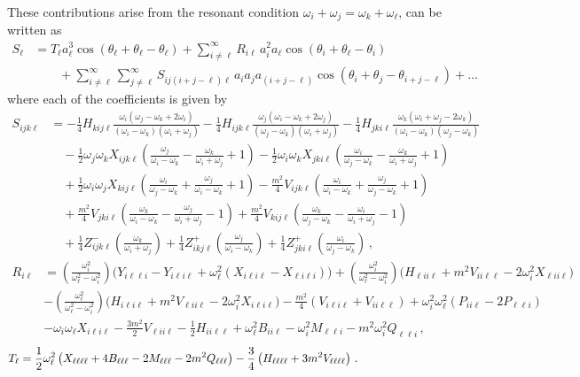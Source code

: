 \documentclass[letterpaper,11pt]{article}
\newcommand{\oi}{\omega_i}
\newcommand{\oj}{\omega_j}
\newcommand{\ok}{\omega_k}
\newcommand{\ol}{\omega_\ell}
\newcommand{\thi}{\theta_i}
\newcommand{\thj}{\theta_j}
\newcommand{\thl}{\theta_\ell}
\begin{document}
These contributions arise from the resonant condition $\oi + \oj = \ok + \ol$, can be written as
\begin{align}
S_\ell &= T_\ell a^3_\ell \cos (\thl + \thl - \thl) + \sum_{i \neq \ell}^\infty R_{i \ell} \, a^2_i a_\ell \cos(\thi + \thl - \thi) \nonumber \\
& \qquad + \sum_{i \neq \ell}^\infty \sum_{j \neq \ell}^\infty S_{i j (i + j - \ell) \ell} \, a_i a_j a_{(i + j - \ell)} \cos(\thi + \thj - \theta_{i + j -\ell} ) + \ldots
\end{align}
where each of the coefficients is given by
\begin{align}
S_{ijk\ell} &= - \frac{1}{4} H_{kij\ell} \frac{\oi (\oj - \ok + 2\oi)}{(\oi - \ok)(\oi + \oj)} -\frac{1}{4} H_{ijk\ell} \frac{\oj (\oi - \ok + 2\oj)}{(\oj - \ok)(\oi + \oj)} - \frac{1}{4} H_{jki\ell} \frac{\ok ( \oi + \oj - 2\ok)}{(\oi - \ok)(\oj - \ok)} \nonumber \\
%
& \quad - \frac{1}{2} \oj \ok X_{ijk\ell} \left( \frac{\oj}{\oi - \ok} - \frac{\ok}{\oi + \oj} + 1 \right) - \frac{1}{2} \oi \ok X_{jki\ell} \left( \frac{\oi}{\oj - \ok} - \frac{\ok}{\oi + \oj} + 1 \right) \nonumber \\
%
& \quad + \frac{1}{2} \oi \oj X_{kij\ell} \left( \frac{\oi}{\oj - \ok} + \frac{\oj}{\oi - \ok} + 1 \right) - \frac{m^2}{4} V_{ijk\ell} \left( \frac{\oi}{\oi - \ok} + \frac{\oj}{\oj - \ok} + 1\right) \nonumber \\
%
& \quad + \frac{m^2}{4} V_{jki\ell} \left( \frac{\ok}{\oi - \ok} - \frac{\oj}{\oi + \oj} - 1 \right) + \frac{m^2}{4} V_{kij\ell} \left( \frac{\ok}{\oj - \ok} - \frac{\oi}{\oi + \oj} - 1 \right) \nonumber \\
%
& \quad + \frac{1}{4}  Z^-_{ijk\ell} \left( \frac{\ok}{\oi + \oj}\right)  + \frac{1}{4}  Z^+_{ikj\ell} \left( \frac{\oj}{\oi - \ok}\right) + \frac{1}{4} Z^+_{jki\ell} \left( \frac{\oi}{\oj - \ok} \right) \, ,
\end{align}
\begin{align}
R_{i\ell} &= \left(\frac{\oi^2}{\ol^2 - \oi^2} \right) \big( Y_{i\ell \ell i} - Y_{i\ell i \ell} + \ol^2 ( X_{i\ell i \ell} - X_{\ell i \ell i}) \big) + \left(\frac{\oi^2}{\ol^2 - \oi^2}\right) \big( H_{\ell i i\ell} + m^2 V_{ii\ell \ell} - 2\oi^2 X_{\ell i i \ell} \big) \nonumber \\
%
& - \left(\frac{\ol^2}{\ol^2 - \oi^2} \right) \big( H_{i\ell i \ell} + m^2 V_{\ell i i \ell} - 2\oi^2 X_{i\ell i\ell} \big) - \frac{m^2}{4}(V_{i\ell i \ell} + V_{ii\ell \ell} ) + \oi^2 \ol^2 (P_{ii\ell} - 2P_{\ell \ell i}) \nonumber \\
%
& - \oi\ol X_{i\ell i \ell} - \frac{3m^2}{2} V_{\ell ii \ell} - \frac{1}{2} H_{ii\ell \ell} + \ol^2 B_{ii\ell} - \oi^2 M_{\ell \ell i} - m^2 \oi^2 Q_{\ell \ell i} \, ,
\end{align}
\begin{align}
T_{\ell} &= \frac{1}{2} \ol^2 \left( X_{\ell \ell \ell \ell} + 4 B_{\ell \ell \ell} -2 M_{\ell \ell \ell} - 2m^2 Q_{\ell \ell \ell} \right) -\frac{3}{4} \left( H_{\ell \ell \ell \ell} + 3m^2 V_{\ell \ell \ell \ell} \right) \, . \hspace{1.0in}
\end{align}
\end{document}
